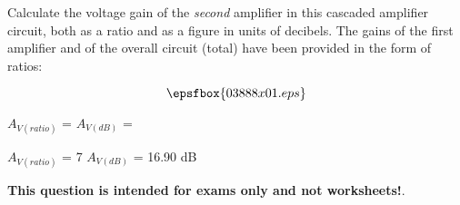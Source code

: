 

Calculate the voltage gain of the {\it second} amplifier in this cascaded amplifier circuit, both as a ratio and as a figure in units of decibels.  The gains of the first amplifier and of the overall circuit (total) have been provided in the form of ratios:

$$\epsfbox{03888x01.eps}$$

$A_{V(ratio)}$ =  \hskip 80pt $A_{V(dB)}$ = 







$A_{V(ratio)}$ = 7 \hskip 50pt $A_{V(dB)}$ = 16.90 dB







{\bf This question is intended for exams only and not worksheets!}.



